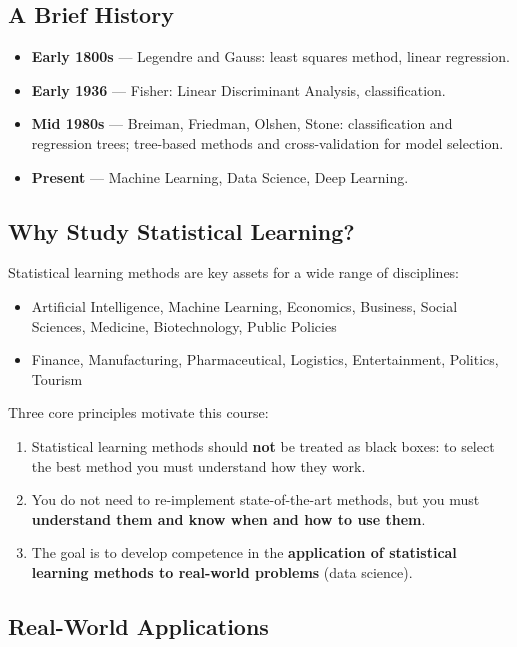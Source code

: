 \documentclass[11pt,a4paper]{article}
\theoremstyle{definition}
\theoremstyle{plain}
\theoremstyle{remark}
\begin{document}
\subsection{A Brief History}

\begin{itemize}
    \item \textbf{Early 1800s} — Legendre and Gauss: least squares method, linear regression.
    \item \textbf{Early 1936} — Fisher: Linear Discriminant Analysis, classification.
    \item \textbf{Mid 1980s} — Breiman, Friedman, Olshen, Stone: classification and regression trees; tree-based methods and cross-validation for model selection.
    \item \textbf{Present} — Machine Learning, Data Science, Deep Learning.
\end{itemize}

\subsection{Why Study Statistical Learning?}

Statistical learning methods are key assets for a wide range of disciplines:
\begin{itemize}
    \item Artificial Intelligence, Machine Learning, Economics, Business, Social Sciences, Medicine, Biotechnology, Public Policies
    \item Finance, Manufacturing, Pharmaceutical, Logistics, Entertainment, Politics, Tourism
\end{itemize}

Three core principles motivate this course:
\begin{enumerate}
    \item Statistical learning methods should \textbf{not} be treated as black boxes: to select the best method you must understand how they work.
    \item You do not need to re-implement state-of-the-art methods, but you must \textbf{understand them and know when and how to use them}.
    \item The goal is to develop competence in the \textbf{application of statistical learning methods to real-world problems} (data science).
\end{enumerate}

\subsection{Real-World Applications}
\end{document}

